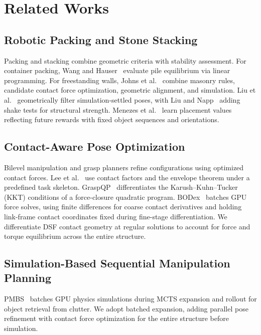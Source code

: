 \section{Related Works} \label{sec:related_works}

\subsection{Robotic Packing and Stone Stacking}
Packing and stacking combine geometric criteria with stability assessment.
For container packing, Wang and Hauser~\cite{wang2022binpacking} evaluate pile equilibrium via linear programming.
For freestanding walls, Johns et al.~\cite{johns2020autonomous,johns2023framework} combine masonry rules, candidate contact force optimization, geometric alignment, and simulation.
Liu et al.~\cite{liu2021drystacking} geometrically filter simulation-settled poses, with Liu and Napp~\cite{liu2023stability} adding shake tests for structural strength.
Menezes et al.~\cite{menezes2021rocks} learn placement values reflecting future rewards with fixed object sequences and orientations.

\subsection{Contact-Aware Pose Optimization}
Bilevel manipulation and grasp planners refine configurations using optimized contact forces.
Lee et al.~\cite{lee2025contactfactorgraph} use contact factors and the envelope theorem under a predefined task skeleton.
GraspQP~\cite{zurbrugg2025graspqp} differentiates the Karush--Kuhn--Tucker (KKT) conditions of a force-closure quadratic program.
BODex~\cite{chen2025bodex} batches GPU force solves, using finite differences for coarse contact derivatives and holding link-frame contact coordinates fixed during fine-stage differentiation.
We differentiate DSF contact geometry at regular solutions to account for force and torque equilibrium across the entire structure.

\subsection{Simulation-Based Sequential Manipulation Planning}
PMBS~\cite{huang2022pmbs} batches GPU physics simulations during MCTS expansion and rollout for object retrieval from clutter.
We adopt batched expansion, adding parallel pose refinement with contact force optimization for the entire structure before simulation.
